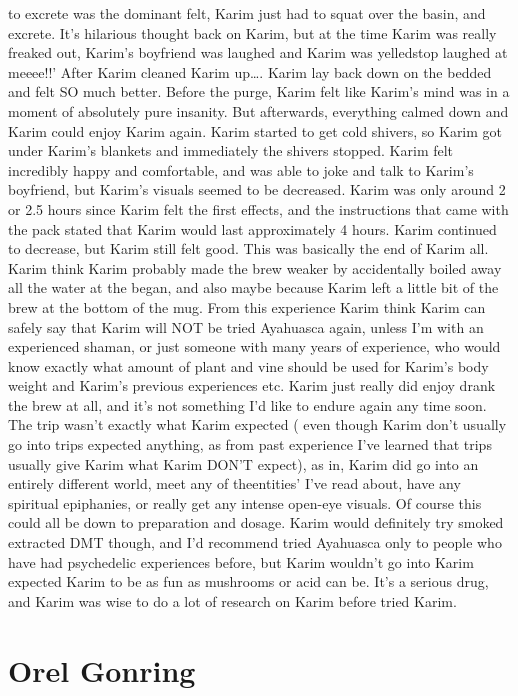 \documentclass[12pt]{book}
\begin{document}
to excrete was the dominant felt, Karim just had to squat over the basin, and excrete. It's hilarious thought back on Karim, but at the time Karim was really freaked out, Karim's boyfriend was laughed and Karim was yelledstop laughed at meeee!!' After Karim cleaned Karim up\ldots . Karim lay back down on the bedded and felt SO much better. Before the purge, Karim felt like Karim's mind was in a moment of absolutely pure insanity. But afterwards, everything calmed down and Karim could enjoy Karim again. Karim started to get cold shivers, so Karim got under Karim's blankets and immediately the shivers stopped. Karim felt incredibly happy and comfortable, and was able to joke and talk to Karim's boyfriend, but Karim's visuals seemed to be decreased. Karim was only around 2 or 2.5 hours since Karim felt the first effects, and the instructions that came with the pack stated that Karim would last approximately 4 hours. Karim continued to decrease, but Karim still felt good. This was basically the end of Karim all. Karim think Karim probably made the brew weaker by accidentally boiled away all the water at the began, and also maybe because Karim left a little bit of the brew at the bottom of the mug. From this experience Karim think Karim can safely say that Karim will NOT be tried Ayahuasca again, unless I'm with an experienced shaman, or just someone with many years of experience, who would know exactly what amount of plant and vine should be used for Karim's body weight and Karim's previous experiences etc. Karim just really did enjoy drank the brew at all, and it's not something I'd like to endure again any time soon. The trip wasn't exactly what Karim expected ( even though Karim don't usually go into trips expected anything, as from past experience I've learned that trips usually give Karim what Karim DON'T expect), as in, Karim did go into an entirely different world, meet any of theentities' I've read about, have any spiritual epiphanies, or really get any intense open-eye visuals. Of course this could all be down to preparation and dosage. Karim would definitely try smoked extracted DMT though, and I'd recommend tried Ayahuasca only to people who have had psychedelic experiences before, but Karim wouldn't go into Karim expected Karim to be as fun as mushrooms or acid can be. It's a serious drug, and Karim was wise to do a lot of research on Karim before tried Karim.



\chapter{Orel Gonring}
\end{document}
